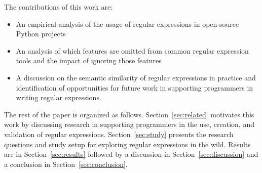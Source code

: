 The contributions of this work are:

\begin{itemize}
	\item An empirical analysis of the usage of regular expressions in  open-source Python projects
	\item An analysis of which features are omitted from common regular expression tools and the impact of ignoring those features
	\item A discussion on the semantic similarity of regular expressions in practice and identification of opportunities for future work in supporting programmers in writing regular expressions.
\end{itemize}

The rest of the paper is organized as follows. Section~\ref{sec:related} motivates this work by discussing research in supporting programmers in the use, creation, and validation of regular expressions. Section~\ref{sec:study} presents the research questions and study setup for exploring regular expressions in the wild. Results are in Section~\ref{sec:results} followed by a discussion in Section~\ref{sec:discussion} and a conclusion in Section~\ref{sec:conclusion}.
